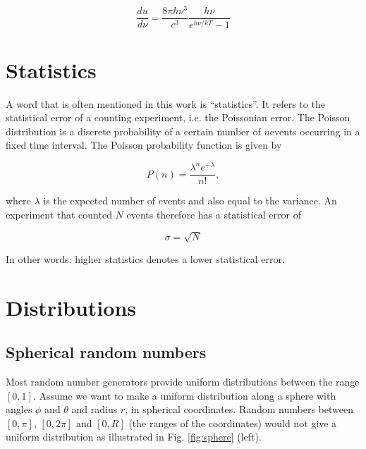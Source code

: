 \begin{appendices}
\begin{equation}
\frac{du}{d\nu} = \frac{8\pi h \nu^3}{c^3} \frac{h\nu}{e^{h\nu/kT} - 1}
\end{equation}

\chapter{Statistics}
A word that is often mentioned in this work is ``statistics''. It refers to the statistical error of a counting experiment, i.e. the Poissonian error. The Poisson distribution is a discrete probability of a certain number of $n$events occurring in a fixed time interval. The Poisson probability function is given by

\begin{equation}
P(n) = \frac{\lambda^n e^{-\lambda}}{n!},
\end{equation}

\noindent where $\lambda$ is the expected number of events and also equal to the variance. An experiment that counted $N$ events therefore has a statistical error of

\begin{equation}
\sigma = \sqrt{N}
\end{equation}

\noindent In other words: higher statistics denotes a lower statistical error.

\chapter{Distributions}
\label{ch:distributions}

\section{Spherical random numbers}
\label{sec:sphericalrandom}
Most random number generators provide uniform distributions between the range $[0,1]$. Assume we want to make a uniform distribution along a sphere with angles $\phi$ and $\theta$ and radius $r$, in spherical coordinates. Random numbers between $[0,\pi]$, $[0,2\pi]$ and $[0,R]$ (the ranges of the coordinates) would not give a uniform distribution as illustrated in Fig. \ref{fig:sphere} (left).


\end{appendices}

